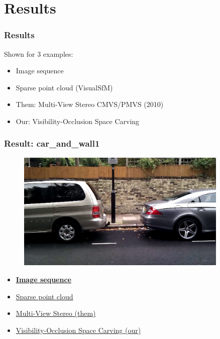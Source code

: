 \documentclass{beamer}
\begin{document}
\section{Results}

\begin{frame}
  \frametitle{Results}
  Shown for 3 examples:
  \begin{itemize}
    \item Image sequence
    \item Sparse point cloud (VisualSfM)
    \item Them: Multi-View Stereo CMVS/PMVS (2010)
    \item Our: Visibility-Occlusion Space Carving
  \end{itemize}
\end{frame}

\begin{frame}
  \frametitle{Result: car\_and\_wall1}
  \begin{figure}[htb!]
   \centering
   \includegraphics[width=0.9\textwidth]{img/car_and_wall1_frame}  %
  \end{figure}
  \begin{itemize}
    \item \href{run:./vid/01-result1-seq.mp4}{\textbf{Image sequence}} \\
    \item \href{run:./vid/02-result1-sparse.mp4}{Sparse point cloud} \\
    \item \href{run:./vid/03-result1-mvs.mp4}{Multi-View Stereo (them)} \\
    \item \href{run:./vid/04-result1-visocc.mp4}{Visibility-Occlusion Space Carving (our)} \\
  \end{itemize}
\end{frame}
\end{document}
